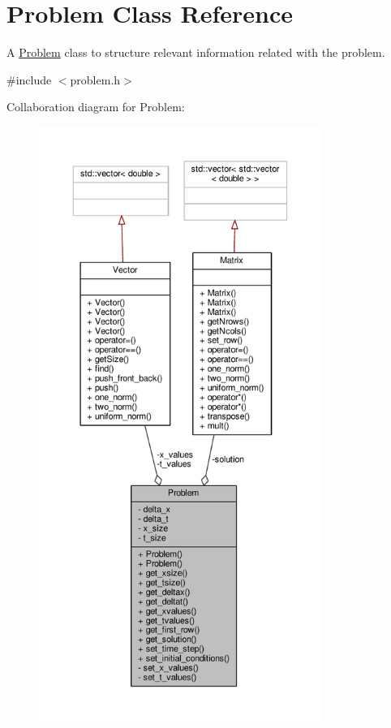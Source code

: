 \hypertarget{classProblem}{}\section{Problem Class Reference}
\label{classProblem}


A \hyperlink{classProblem}{Problem} class to structure relevant information related with the problem.  




{\ttfamily \#include $<$problem.\+h$>$}



Collaboration diagram for Problem\+:
\nopagebreak
\begin{figure}[H]
\begin{center}
\leavevmode
\includegraphics[height=550pt]{classProblem__coll__graph}
\end{center}
\end{figure}
